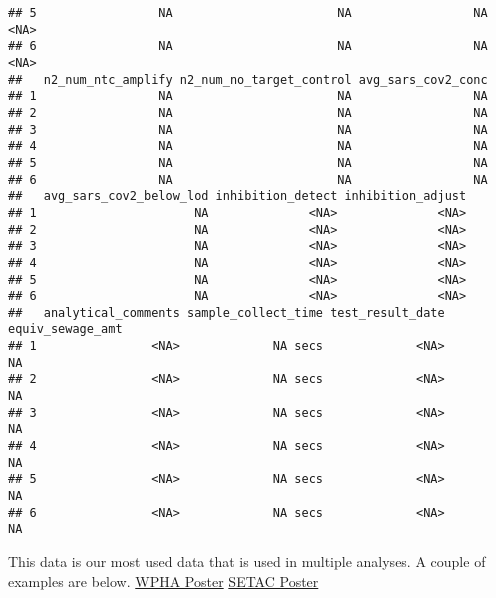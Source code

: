 \documentclass[
]{article}
\begin{document}
\begin{verbatim}
## 5                 NA                       NA                 NA           <NA>
## 6                 NA                       NA                 NA           <NA>
##   n2_num_ntc_amplify n2_num_no_target_control avg_sars_cov2_conc
## 1                 NA                       NA                 NA
## 2                 NA                       NA                 NA
## 3                 NA                       NA                 NA
## 4                 NA                       NA                 NA
## 5                 NA                       NA                 NA
## 6                 NA                       NA                 NA
##   avg_sars_cov2_below_lod inhibition_detect inhibition_adjust
## 1                      NA              <NA>              <NA>
## 2                      NA              <NA>              <NA>
## 3                      NA              <NA>              <NA>
## 4                      NA              <NA>              <NA>
## 5                      NA              <NA>              <NA>
## 6                      NA              <NA>              <NA>
##   analytical_comments sample_collect_time test_result_date equiv_sewage_amt
## 1                <NA>             NA secs             <NA>               NA
## 2                <NA>             NA secs             <NA>               NA
## 3                <NA>             NA secs             <NA>               NA
## 4                <NA>             NA secs             <NA>               NA
## 5                <NA>             NA secs             <NA>               NA
## 6                <NA>             NA secs             <NA>               NA
\end{verbatim}

This data is our most used data that is used in multiple analyses. A
couple of examples are below.
\href{https://github.com/AFIDSI/Covid19-Wastewater-Analysis/blob/main/conclusions/WPHA-Poster/WPHA-Poster.pdf}{WPHA
Poster}
\href{https://github.com/AFIDSI/Covid19-Wastewater-Analysis/blob/main/conclusions/SETAC-Poster/SETAC-Poster.pdf}{SETAC
Poster}
\end{document}
